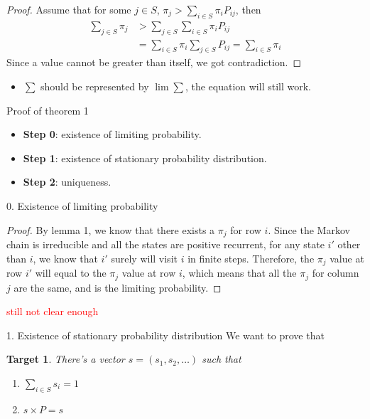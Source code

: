 \documentclass{beamer}
\newtheorem{target}{Target}
\begin{document}
\begin{frame}
	\begin{proof}
		Assume that for some $j \in S$,
		$\pi_j > \sum_{i \in S} \pi_i P_{ij}$, then
		\begin{align*}
			\sum_{j \in S} \pi_j &> \sum_{j \in S}\sum_{i \in S} \pi_i P_{ij} \\
			&= \sum_{i \in S} \pi_i \sum_{j \in S} P_{ij} = \sum_{i \in S} \pi_i
		\end{align*}
		Since a value cannot be greater than itself, we got contradiction.
	\end{proof}
	\begin{itemize}
		\item $\sum$ should be represented by $\lim \sum$, the equation will still work.
	\end{itemize}
\end{frame}

\begin{frame}{Proof of theorem 1}\label{thm1_proof}
	\begin{itemize}
		\item \textbf{Step 0}: existence of limiting probability.
		\item \textbf{Step 1}: existence of stationary probability distribution.
		\item \textbf{Step 2}: uniqueness.
	\end{itemize}
\end{frame}

\begin{frame}{0. Existence of limiting probability}
	\begin{proof}
		By lemma 1, we know that there exists a $\pi_j$ for row $i$.
		Since the Markov chain is irreducible and all the states are positive recurrent, 
		for any state $i'$ other than $i$, we know that $i'$ surely will visit $i$ in finite steps.
		Therefore, the $\pi_j$ value at row $i'$ will equal to the $\pi_j$ value at row $i$,
		which means that all the $\pi_j$ for column $j$ are the same, and is the limiting probability.
	\end{proof}
	\textcolor{red}{still not clear enough}
\end{frame}

\begin{frame}{1. Existence of stationary probability distribution}
	We want to prove that
	\begin{target}
		There's a vector $s = (s_1, s_2, \ldots)$ such that
		\begin{enumerate}
			\item $\sum_{i \in S} s_i = 1$
			\item $s \times P = s$
		\end{enumerate}
	\end{target}
\end{frame}
\end{document}
